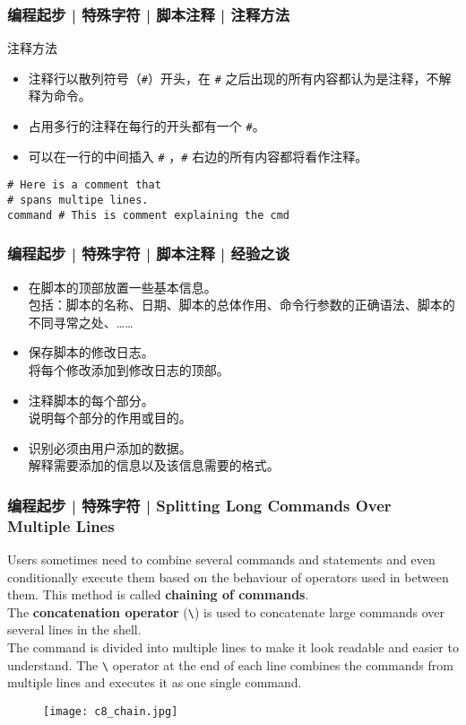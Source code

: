 \begin{frame}[fragile]
  \frametitle{编程起步 | 特殊字符 | 脚本注释 | \alert{注释方法}}
  \begin{block}{注释方法}
    \begin{itemize}
      \item 注释行以散列符号（\verb|#|）开头，在 \verb|#| 之后出现的所有内容都认为是注释，不解释为命令。
      \item 占用多行的注释在每行的开头都有一个 \verb|#|。
      \item 可以在一行的中间插入 \verb|#| ，\verb|#| 右边的所有内容都将看作注释。
    \end{itemize}
  \end{block}
  \pause
\begin{lstlisting}
# Here is a comment that
# spans multipe lines.
command # This is comment explaining the cmd
\end{lstlisting}
\end{frame}

\begin{frame}
  \frametitle{编程起步 | 特殊字符 | 脚本注释 | 经验之谈}
  \begin{itemize}
    \item 在脚本的顶部放置一些基本信息。\\ \qquad 包括：脚本的名称、日期、脚本的总体作用、命令行参数的正确语法、脚本的不同寻常之处、……
    \item 保存脚本的修改日志。\\ \qquad 将每个修改添加到修改日志的顶部。
    \item 注释脚本的每个部分。\\ \qquad 说明每个部分的作用或目的。
    \item 识别必须由用户添加的数据。\\ \qquad 解释需要添加的信息以及该信息需要的格式。
  \end{itemize}
\end{frame}

\begin{frame}[fragile]
  \frametitle{编程起步 | 特殊字符 | Splitting Long Commands Over Multiple Lines}
  Users sometimes need to combine several commands and statements and even conditionally execute them based on the behaviour of operators used in between them. This method is called \textbf{chaining of commands}.\\
  \vspace{0.2cm}
  The \textbf{concatenation operator} (\verb|\|) is used to concatenate large commands over several lines in the shell.\\
  \vspace{0.2cm}
  The command is divided into multiple lines to make it look readable and easier to understand. The \verb|\| operator at the end of each line combines the commands from multiple lines and executes it as one single command.
  \begin{figure}
    \centering
    \texttt{[image: c8\_chain.jpg]}
  \end{figure}
\end{frame}

